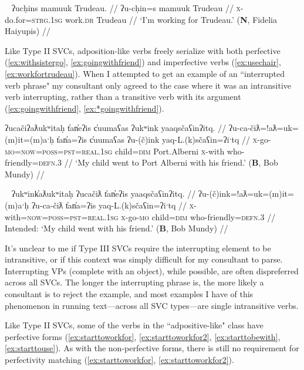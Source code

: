 \ex~ \label{ex:workfortrudeau}
\begingl
\glpreamble ʔucḥins mamuuk Trudeau. //
\gla ʔu-cḥin=s mamuuk Trudeau //
\glb \textsc{x}-do.for=\textsc{strg.1sg} work.\textsc{dr} Trudeau //
\glft `I'm working for Trudeau.' (\textbf{N}, Fidelia Haiyupis) //
\endgl
\xe

Like Type II SVCs, adposition-like verbs freely serialize with both perfective (\ref{ex:withsistergo}, \ref{ex:goingwithfriend}) and imperfective verbs (\ref{ex:usechair}, \ref{ex:workfortrudeau}). When I attempted to get an example of an ``interrupted verb phrase" my consultant only agreed to the case where it was an intransitive verb interrupting, rather than a transitive verb with its argument (\ref{ex:goingwithfriend}, \ref{ex:*goingwithfriend}).

\ex \label{ex:goingwithfriend}
\begingl
\glpreamble ʔucačiʔaƛukʷitaḥ t̓an̓eʔis c̓uumaʕas ʔukʷink yaaqsčaʕinʔitq. //
\gla ʔu-ca-čiƛ=!aƛ=uk=(m)it=(m)aˑḥ t̓an̓a=ʔis c̓uumaʕas ʔu-(č)ink yaq-L.(k)sčaʕin=ʔiˑtq //
\glb \textsc{x}-go-\textsc{mo}=\textsc{now}=\textsc{poss}=\textsc{pst}=\textsc{real.1sg} child=\textsc{dim} Port.Alberni \textsc{x}-with who-friendly=\textsc{defn.3} //
\glft `My child went to Port Alberni with his friend.' (\textbf{B}, Bob Mundy) //
\endgl
\xe

\ex~ \label{ex:*goingwithfriend}
\begingl
\glpreamble *ʔukʷink̓aƛukʷitaḥ ʔucačiƛ t̓an̓eʔis yaaqsčaʕinʔitq. //
\gla ʔu-(č)ink=!aƛ=uk=(m)it=(m)aˑḥ ʔu-ca-čiƛ t̓an̓a=ʔis yaq-L.(k)sčaʕin=ʔiˑtq //
\glb \textsc{x}-with=\textsc{now}=\textsc{poss}=\textsc{pst}=\textsc{real.1sg} \textsc{x}-go-\textsc{mo} child=\textsc{dim} who-friendly=\textsc{defn.3} //
\glft Intended: `My child went with his friend.' (\textbf{B}, Bob Mundy) //
\endgl
\xe

It's unclear to me if Type III SVCs require the interrupting element to be intransitive, or if this context was simply difficult for my consultant to parse. Interrupting VPs (complete with an object), while possible, are often dispreferred across all SVCs. The longer the interrupting phrase is, the more likely a consultant is to reject the example, and most examples I have of this phenomenon in running text---across all SVC types---are single intransitive verbs.


Like Type II SVCs, some of the verbs in the ``adpositive-like" class have perfective forms (\ref{ex:starttoworkfor}, \ref{ex:starttoworkfor2}, \ref{ex:starttobewith}, \ref{ex:starttouse}). As with the non-perfective forms, there is still no requirement for perfectivity matching (\ref{ex:starttoworkfor}, \ref{ex:starttoworkfor2}).

